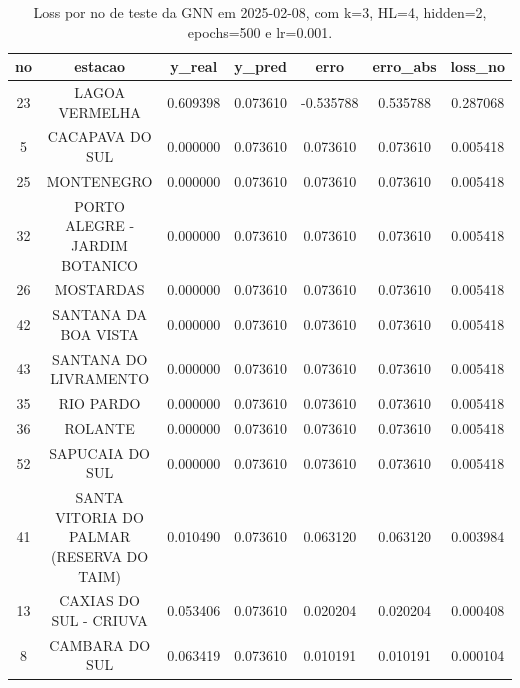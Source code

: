 \begin{table}[h]
\centering
\caption{Loss por no de teste da GNN em 2025-02-08, com k=3, HL=4, hidden=2, epochs=500 e lr=0.001.}
\label{tab:gnn_loss_k3_hl4_h2_e500_d20250208}
\begin{tabular}{ccccccc}
\toprule
no & estacao & y\_real & y\_pred & erro & erro\_abs & loss\_no \\
\midrule
23 & LAGOA VERMELHA & 0.609398 & 0.073610 & -0.535788 & 0.535788 & 0.287068 \\
5 & CACAPAVA DO SUL & 0.000000 & 0.073610 & 0.073610 & 0.073610 & 0.005418 \\
25 & MONTENEGRO & 0.000000 & 0.073610 & 0.073610 & 0.073610 & 0.005418 \\
32 & PORTO ALEGRE - JARDIM BOTANICO & 0.000000 & 0.073610 & 0.073610 & 0.073610 & 0.005418 \\
26 & MOSTARDAS & 0.000000 & 0.073610 & 0.073610 & 0.073610 & 0.005418 \\
42 & SANTANA DA BOA VISTA & 0.000000 & 0.073610 & 0.073610 & 0.073610 & 0.005418 \\
43 & SANTANA DO LIVRAMENTO & 0.000000 & 0.073610 & 0.073610 & 0.073610 & 0.005418 \\
35 & RIO PARDO & 0.000000 & 0.073610 & 0.073610 & 0.073610 & 0.005418 \\
36 & ROLANTE & 0.000000 & 0.073610 & 0.073610 & 0.073610 & 0.005418 \\
52 & SAPUCAIA DO SUL & 0.000000 & 0.073610 & 0.073610 & 0.073610 & 0.005418 \\
41 & SANTA VITORIA DO PALMAR (RESERVA DO TAIM) & 0.010490 & 0.073610 & 0.063120 & 0.063120 & 0.003984 \\
13 & CAXIAS DO SUL - CRIUVA & 0.053406 & 0.073610 & 0.020204 & 0.020204 & 0.000408 \\
8 & CAMBARA DO SUL & 0.063419 & 0.073610 & 0.010191 & 0.010191 & 0.000104 \\
\bottomrule
\end{tabular}
\end{table}
